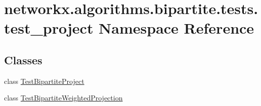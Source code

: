 \hypertarget{namespacenetworkx_1_1algorithms_1_1bipartite_1_1tests_1_1test__project}{}\section{networkx.\+algorithms.\+bipartite.\+tests.\+test\+\_\+project Namespace Reference}
\label{namespacenetworkx_1_1algorithms_1_1bipartite_1_1tests_1_1test__project}
\subsection*{Classes}
\begin{DoxyCompactItemize}
\item 
class \hyperlink{classnetworkx_1_1algorithms_1_1bipartite_1_1tests_1_1test__project_1_1TestBipartiteProject}{Test\+Bipartite\+Project}
\item 
class \hyperlink{classnetworkx_1_1algorithms_1_1bipartite_1_1tests_1_1test__project_1_1TestBipartiteWeightedProjection}{Test\+Bipartite\+Weighted\+Projection}
\end{DoxyCompactItemize}

